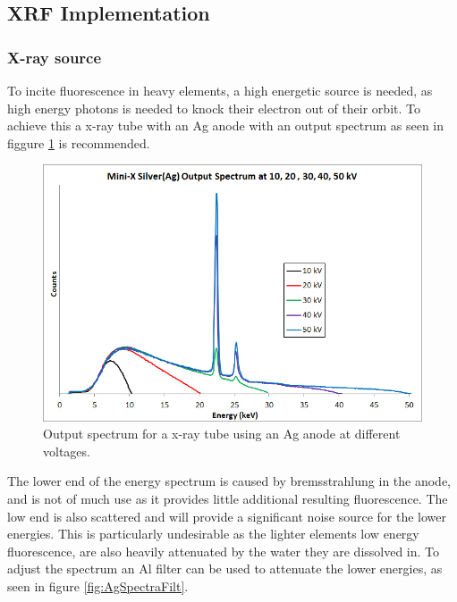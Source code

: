 \subsection{XRF Implementation}

\subsubsection{X-ray source}
To incite fluorescence in heavy elements, a high energetic source is needed, as high energy photons is needed to knock their electron out of their orbit. To achieve this a x-ray tube with an Ag anode with an output spectrum as seen in figgure \ref{fig:AgSpectra} is recommended.

\begin{figure}[h]
	\centering
	\includegraphics[width=\textwidth]{figures/XRF/minix50_ag6.png}
	\caption{Output spectrum for a x-ray tube using an Ag anode at different voltages.\citep{AmptekSource}}
	\label{fig:AgSpectra}
\end{figure}

The lower end of the energy spectrum is caused by bremsstrahlung in the anode, and is not of much use as it provides little additional resulting fluorescence. The low end is also scattered and will provide a significant noise source for the lower energies. This is particularly undesirable as the lighter elements low energy fluorescence, are also heavily attenuated by the water they are dissolved in. To adjust the spectrum an Al filter can be used to attenuate the lower energies, as seen in figure \ref{fig:AgSpectraFilt}.

